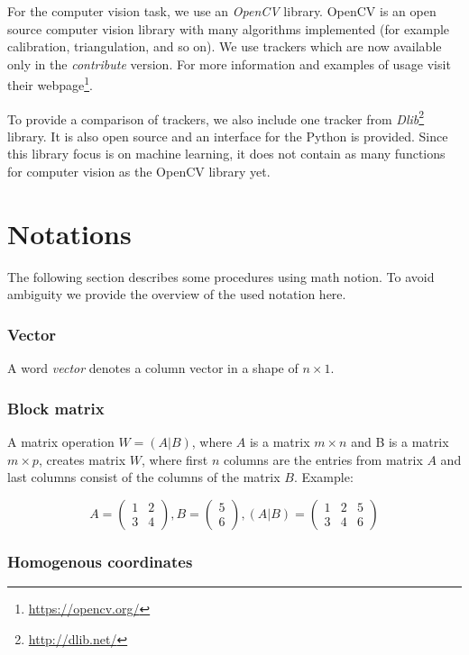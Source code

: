 For the computer vision task, we use an \emph{OpenCV} library. OpenCV is an open
source computer vision library with many algorithms implemented (for example
calibration, triangulation, and so on). We use trackers which are now available
only in the \emph{contribute} version. For more information and examples of usage
visit their webpage\footnote{\url{https://opencv.org/}}.

To provide a comparison of trackers, we also include one tracker from
\emph{Dlib}\footnote{\url{http://dlib.net/}} library. It is also open source
and an interface for the Python is provided.  Since this library focus is on
machine learning, it does not contain as many functions for computer vision
as the OpenCV library yet.

\section{Notations}

The following section describes some procedures using math notion. To avoid
ambiguity we provide the overview of the used notation here.

\subsubsection*{Vector}
A word \emph{vector} denotes a column vector in a shape of $n\times1$.

\subsubsection*{Block matrix}
A matrix operation $W = (A|B)$, where $A$ is a matrix $m \times n$ and B is a
matrix $m \times p$, creates matrix $W$, where first $n$ columns are the entries from
matrix $A$ and last columns consist of the columns of the matrix $B$.
Example:

\[
A = \begin{pmatrix}
        1 & 2 \\
        3 & 4
\end{pmatrix},
B = \begin{pmatrix}
5 \\
6
\end{pmatrix},
(A|B) = \begin{pmatrix}
        1 & 2 & 5 \\
        3 & 4 & 6
\end{pmatrix}
\]

\subsubsection*{Homogenous coordinates}

